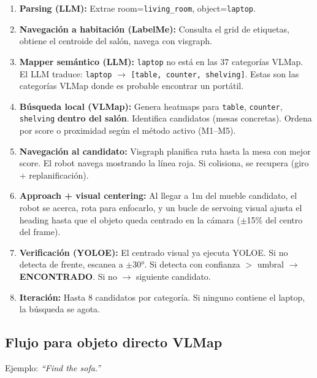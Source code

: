 \documentclass[11pt,a4paper]{article}
\begin{document}
\begin{enumerate}
    \item \textbf{Parsing (LLM):} Extrae room=\texttt{living\_room}, object=\texttt{laptop}.

    \item \textbf{Navegación a habitación (LabelMe):} Consulta el grid de etiquetas, obtiene el centroide del salón, navega con visgraph.

    \item \textbf{Mapper semántico (LLM):} \texttt{laptop} no está en las 37 categorías VLMap. El LLM traduce: \texttt{laptop} $\rightarrow$ \texttt{[table, counter, shelving]}. Estas son las categorías VLMap donde es probable encontrar un portátil.

    \item \textbf{Búsqueda local (VLMap):} Genera heatmaps para \texttt{table}, \texttt{counter}, \texttt{shelving} \textbf{dentro del salón}. Identifica candidatos (mesas concretas). Ordena por score o proximidad según el método activo (M1--M5).

    \item \textbf{Navegación al candidato:} Visgraph planifica ruta hasta la mesa con mejor score. El robot navega mostrando la línea roja. Si colisiona, se recupera (giro + replanificación).

    \item \textbf{Approach + visual centering:} Al llegar a 1m del mueble candidato, el robot se acerca, rota para enfocarlo, y un bucle de servoing visual ajusta el heading hasta que el objeto queda centrado en la cámara ($\pm$15\% del centro del frame).

    \item \textbf{Verificación (YOLOE):} El centrado visual ya ejecuta YOLOE. Si no detecta de frente, escanea a $\pm$30°. Si detecta con confianza $>$ umbral $\rightarrow$ \textbf{ENCONTRADO}. Si no $\rightarrow$ siguiente candidato.

    \item \textbf{Iteración:} Hasta 8 candidatos por categoría. Si ninguno contiene el laptop, la búsqueda se agota.
\end{enumerate}

\subsection{Flujo para objeto directo VLMap}

Ejemplo: \textit{``Find the sofa.''}
\end{document}
